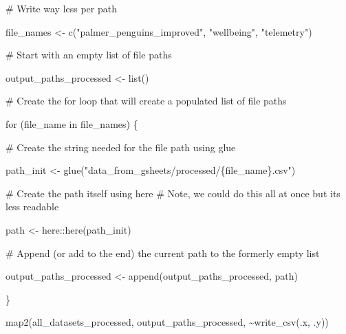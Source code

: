 \documentclass[
  letterpaper,
  DIV=11,
  numbers=noendperiod]{scrreprt}
\newenvironment{Shaded}{\begin{snugshade}}{\end{snugshade}}
\newcommand{\CommentTok}[1]{\textcolor[rgb]{0.37,0.37,0.37}{#1}}
\newcommand{\ControlFlowTok}[1]{\textcolor[rgb]{0.00,0.23,0.31}{#1}}
\newcommand{\FunctionTok}[1]{\textcolor[rgb]{0.28,0.35,0.67}{#1}}
\newcommand{\NormalTok}[1]{\textcolor[rgb]{0.00,0.23,0.31}{#1}}
\newcommand{\OtherTok}[1]{\textcolor[rgb]{0.00,0.23,0.31}{#1}}
\newcommand{\SpecialCharTok}[1]{\textcolor[rgb]{0.37,0.37,0.37}{#1}}
\newcommand{\StringTok}[1]{\textcolor[rgb]{0.13,0.47,0.30}{#1}}
\begin{document}
\begin{Shaded}
\begin{Highlighting}[]
\CommentTok{\# Write way less per path}

\NormalTok{file\_names }\OtherTok{\textless{}{-}} \FunctionTok{c}\NormalTok{(}\StringTok{"palmer\_penguins\_improved"}\NormalTok{,}
                \StringTok{"wellbeing"}\NormalTok{,}
                \StringTok{"telemetry"}\NormalTok{)}

\CommentTok{\# Start with an empty list of file paths}

\NormalTok{output\_paths\_processed }\OtherTok{\textless{}{-}} \FunctionTok{list}\NormalTok{()}

\CommentTok{\# Create the for loop that will create a populated list of file paths}

\ControlFlowTok{for}\NormalTok{ (file\_name }\ControlFlowTok{in}\NormalTok{ file\_names) \{}
  
  \CommentTok{\# Create the string needed for the file path using \textasciigrave{}glue\textasciigrave{}}
  
\NormalTok{  path\_init }\OtherTok{\textless{}{-}} \FunctionTok{glue}\NormalTok{(}\StringTok{"data\_from\_gsheets/processed/\{file\_name\}.csv"}\NormalTok{)}
  
  \CommentTok{\# Create the path itself using \textasciigrave{}here\textasciigrave{}}
  \CommentTok{\# Note, we could do this all at once but it\textquotesingle{}s less readable}
  
\NormalTok{  path }\OtherTok{\textless{}{-}}\NormalTok{ here}\SpecialCharTok{::}\FunctionTok{here}\NormalTok{(path\_init)}
  
  \CommentTok{\# Append (or add to the end) the current path to the formerly empty list}
  
\NormalTok{  output\_paths\_processed }\OtherTok{\textless{}{-}} \FunctionTok{append}\NormalTok{(output\_paths\_processed, path)}
  
\NormalTok{\}}
\end{Highlighting}
\end{Shaded}

\begin{Shaded}
\begin{Highlighting}[]
\FunctionTok{map2}\NormalTok{(all\_datasets\_processed, output\_paths\_processed, }\SpecialCharTok{\textasciitilde{}}\FunctionTok{write\_csv}\NormalTok{(.x, .y))}
\end{Highlighting}
\end{Shaded}
\end{document}

